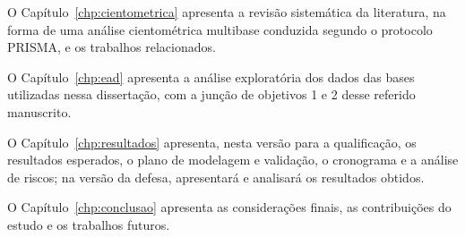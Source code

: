 O Capítulo~\ref{chp:cientometrica} apresenta a revisão sistemática da literatura, na forma de uma análise cientométrica multibase conduzida segundo o protocolo PRISMA, e os trabalhos relacionados.

O Capítulo~\ref{chp:ead} apresenta a análise exploratória dos dados das bases utilizadas nessa dissertação, com a junção de objetivos 1 e 2 desse referido manuscrito.

O Capítulo~\ref{chp:resultados} apresenta, nesta versão para a qualificação, os resultados esperados, o plano de modelagem e validação, o cronograma e a análise de riscos; na versão da defesa, apresentará e analisará os resultados obtidos.

O Capítulo~\ref{chp:conclusao} apresenta as considerações finais, as contribuições do estudo e os trabalhos futuros.